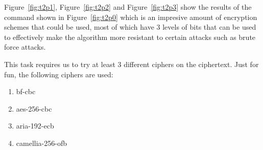 \documentclass[12pt]{article}
\begin{document}
Figure~\ref{fig:t2p1}, Figure~\ref{fig:t2p2} and Figure~\ref{fig:t2p3} show the results of the command shown in  Figure~\ref{fig:t2p0} which is an impresive amount of encryption schemes that could be used, most of which have 3 levels of bits that can be used to effectively make the algorithm more resistant to certain attacks such as brute force attacks.

This task requires us to try at least 3 different ciphers on the ciphertext. Just for fun, the following ciphers are used:

\begin{enumerate}
    \item bf-cbc
    \item aes-256-cbc
    \item aria-192-ecb
    \item camellia-256-ofb
\end{enumerate}
\end{document}
